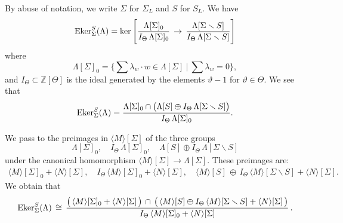 \documentclass[11pt]{amsart}
\renewcommand{\mathbb}{\mathds}
\theoremstyle{plain}
\theoremstyle{definition}
\newcommand{\Z}{{\mathbb Z}}
\newcommand{\vt}{{\vartheta}}
\newcommand{\la}{\langle}
\newcommand{\ra}{\rangle}
\begin{document}
By abuse of notation, we write $\Sigma$ for $\Sigma_L$ and $S$ for $S_L$.
We have
\[{\rm Eker}_\Sigma^S(\Lambda)=\ker \Bigg[\frac{\Lambda[\Sigma]_0}{I_\Theta\, \Lambda[\Sigma]_0}
\,\to\,
\frac{\Lambda[\Sigma\smallsetminus S]}{ I_\Theta\, \Lambda[\Sigma\smallsetminus S]}\Bigg] \]
where
\[ \Lambda[\Sigma]_0=\Big\{\sum \lambda_w\cdot w\in\Lambda[\Sigma]\ \big|\ \sum\lambda_w=0\Big\},\]
and $I_\Theta\subset \Z[\Theta]$
is the ideal generated by the elements $\vt-1$ for $\vt\in\Theta$.
We see that
\[{\rm Eker}_\Sigma^S(\Lambda)= \frac
{\Lambda[\Sigma]_0\cap \big(\Lambda[S]\oplus I_\Theta\, \Lambda[\Sigma\smallsetminus S]\big)}
{I_\Theta\,\Lambda[\Sigma]_0}.
\]

We pass to the preimages in $\la M\ra[\Sigma]$  of the three groups
\[\Lambda[\Sigma]_0,\quad I_\Theta\,\Lambda[\Sigma]_0,\quad
\Lambda[S]\oplus I_\Theta\,\Lambda[\Sigma\smallsetminus S] \]
under the canonical homomorphism $\la M\ra[\Sigma] \to \Lambda[\Sigma]$.
These preimages are:
\begin{gather*}
\la M\ra[\Sigma]_0+ \la N\ra[\Sigma],
\quad
I_\Theta\,\la M\ra[\Sigma]_0 + \la N\ra[\Sigma],
\quad
\la M\ra[S]\,\oplus\, I_\Theta\,\la M\ra[\Sigma\smallsetminus S] + \la N\ra[\Sigma].
\end{gather*}
We obtain that
\[ {\rm Eker}_\Sigma^S(\Lambda)\,\cong\,\frac
{\big(\,\la M\ra[\Sigma]_0 +\la N\ra[\Sigma]\,\big)\,\cap\,
\big(\,\la M\ra[S]\oplus I_\Theta\,\la M\ra[\Sigma\smallsetminus S]
+\la N\ra[\Sigma]\,\big)}
{ I_\Theta\,\la M\ra[\Sigma]_0+\la N\ra[\Sigma]}\,.
\]
\end{document}
